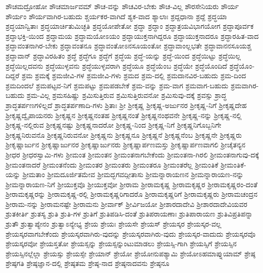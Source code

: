 {ಶೌಚಮದ್ರೋಹೋ
ಶೌಚಮಾರ್ಜವಮ್
ಶೌಚ-ವನ್ನು
ಶೌಚವಿರ-ಬೇಕು
ಶೌಚ-ವಿಲ್ಲ
ಶೌರಸೇನಿಯರು
ಶೌರ್ಯ
ಶೌರ್ಯಂ
ಶೌರ್ಯವಾಗಿರ-ಬಹುದು
ಶ್ಚರ್ಯಕರ-ವಾಗಿದೆ
ಶ್ಯಕ-ವಾದ
ಶ್ಯಾಲಾಃ
ಶ್ರದ್ದಧಾನಾ
ಶ್ರದ್ದೆ
ಶ್ರದ್ಧಯಾ
ಶ್ರದ್ಧಯಾನ್ವಿತಾಃ
ಶ್ರದ್ಧಯಾರ್ಚಿತುಮಿಚ್ಛತಿ
ಶ್ರದ್ಧಯೋಪೇತೋ
ಶ್ರದ್ಧಾ
ಶ್ರದ್ಧಾಂ
ಶ್ರದ್ಧಾತ್ರಯವಿಭಾಗಯೋಗ
ಶ್ರದ್ಧಾಪೂರ್ವಕ
ಶ್ರದ್ಧಾಭಕ್ತಿ-ಯಿಂದ
ಶ್ರದ್ಧಾಮಯ
ಶ್ರದ್ಧಾಮಯೋಽಯಂ
ಶ್ರದ್ಧಾಯುಕ್ತನಾಗಿದ್ದರೂ
ಶ್ರದ್ಧಾಯುಕ್ತನಾದರೂ
ಶ್ರದ್ಧಾರಹಿತ-ವಾದ
ಶ್ರದ್ಧಾವಂತನಾಗಿರ-ಬೇಕು
ಶ್ರದ್ಧಾವಂತನೂ
ಶ್ರದ್ಧಾವಂತೋಽನಸೂಯಂತೋ
ಶ್ರದ್ಧಾವಾಂಲ್ಲಭತೇ
ಶ್ರದ್ಧಾವಾನನಸೂಯಶ್ಚ
ಶ್ರದ್ಧಾವಾನ್
ಶ್ರದ್ಧಾವಿರಹಿತಂ
ಶ್ರದ್ಧೆ
ಶ್ರದ್ಧೆಗೂ
ಶ್ರದ್ಧೆಗೆ
ಶ್ರದ್ಧೆಯ
ಶ್ರದ್ಧೆ-ಯನ್ನು
ಶ್ರದ್ಧೆ-ಯಿಂದ
ಶ್ರದ್ಧೆಯಿಟ್ಟು
ಶ್ರದ್ಧೆಯಿಲ್ಲ
ಶ್ರದ್ಧೆಯಿಲ್ಲದವನು
ಶ್ರದ್ಧೆಯುಳ್ಳವನು
ಶ್ರದ್ಧೆಯುಳ್ಳವರಾಗಿ
ಶ್ರದ್ಧೆಯೂ
ಶ್ರದ್ಧೆಯೆಂಬ
ಶ್ರದ್ಧೆಯೇ
ಶ್ರದ್ಧೆಯೊಂದಿದೆ
ಶ್ರದ್ಧೆಯೊಂ-ದಿದ್ದರೆ
ಶ್ರಮ
ಶ್ರಮಕ್ಕೆ
ಶ್ರಮಜೀವಿ-ಗಳ
ಶ್ರಮಜೀವಿ-ಗಳು
ಶ್ರಮದ
ಶ್ರಮ-ದಲ್ಲಿ
ಶ್ರಮದಾನವಿರ-ಬಹುದು
ಶ್ರಮ-ದಿಂದ
ಶ್ರಮದಿಂದಲೆ
ಶ್ರಮಪಟ್ಟವ-ನಿಗೆ
ಶ್ರಮಪಟ್ಟು
ಶ್ರಮಪಡಬೇಕೆ
ಶ್ರಮ-ವನ್ನು
ಶ್ರಮ-ವಾಗ
ಶ್ರಮವಾಗ-ಬಹುದು
ಶ್ರಮವಾಗಿರ-ಬಹುದು
ಶ್ರಮ-ವಿಲ್ಲ
ಶ್ರಮಸಹಿಷ್ಣು
ಶ್ರಮಿಸುತ್ತಿರುವ
ಶ್ರಮಿಸುತ್ತಿರುವನೋ
ಶ್ರಮಿಸುವು-ದಕ್ಕೆ
ಶ್ರವಸ್ಸು
ಶ್ರಾದ್ಧ
ಶ್ರಾದ್ಧತರ್ಪಣಗಳಿಲ್ಲದೆ
ಶ್ರಾದ್ಧತರ್ಪಣಾದಿ-ಗಳು
ಶ್ರಿತಾಃ
ಶ್ರೀ
ಶ್ರೀಕೃಷ್ಣ
ಶ್ರೀಕೃಷ್ಣ-ಅರ್ಜುನರ
ಶ್ರೀಕೃಷ್ಣ-ನಿಗೆ
ಶ್ರೀಕೃಷ್ಣದೇಹ
ಶ್ರೀಕೃಷ್ಣದ್ವೈಪಾಯನರು
ಶ್ರೀಕೃಷ್ಣನ
ಶ್ರೀಕೃಷ್ಣನಂತಹ
ಶ್ರೀಕೃಷ್ಣನಂತೆ
ಶ್ರೀಕೃಷ್ಣನಂಥವನೇ
ಶ್ರೀಕೃಷ್ಣ-ನನ್ನು
ಶ್ರೀಕೃಷ್ಣ-ನಲ್ಲಿ
ಶ್ರೀಕೃಷ್ಣ-ನಲ್ಲಿರುವ
ಶ್ರೀಕೃಷ್ಣನಷ್ಟು
ಶ್ರೀಕೃಷ್ಣನಾದರೋ
ಶ್ರೀಕೃಷ್ಣ-ನಿಂದ
ಶ್ರೀಕೃಷ್ಣ-ನಿಗೆ
ಶ್ರೀಕೃಷ್ಣನಿಗೊಬ್ಬನಿಗೇ
ಶ್ರೀಕೃಷ್ಣನಿರುವನೊ
ಶ್ರೀಕೃಷ್ಣನಿರುವನೋ
ಶ್ರೀಕೃಷ್ಣನು
ಶ್ರೀಕೃಷ್ಣನೂ
ಶ್ರೀಕೃಷ್ಣನೆ
ಶ್ರೀಕೃಷ್ಣನೆಂಬ
ಶ್ರೀಕೃಷ್ಣನೇ
ಶ್ರೀಕೃಷ್ಣರು
ಶ್ರೀಕೃಷ್ಣಾರ್ಜುನ
ಶ್ರೀಕೃಷ್ಣಾರ್ಜುನರ
ಶ್ರೀಕೃಷ್ಣಾರ್ಜುನರು
ಶ್ರೀಕೃಷ್ಣಾರ್ಪಣಮಸ್ತು
ಶ್ರೀಕೃಷ್ಣಾರ್ಪಣವಾಗಲಿ
ಶ್ರೀಚೈತನ್ಯನ
ಶ್ರೀಧರ
ಶ್ರೀಧರಸ್ವಾಮಿ-ಗಳು
ಶ್ರೀಮಂತ
ಶ್ರೀಮಂತನ
ಶ್ರೀಮಂತನಾಗಬೇಕೆಂದು
ಶ್ರೀಮಂತನಾ-ಗಿರಲಿ
ಶ್ರೀಮಂತನಾಗುವು-ದಕ್ಕೆ
ಶ್ರೀಮಂತನಾದರೆ
ಶ್ರೀಮಂತನೆಂದು
ಶ್ರೀಮಂತರ
ಶ್ರೀಮಂತರು
ಶ್ರೀಮಂತರೂ
ಶ್ರೀಮಂತರೆಲ್ಲ
ಶ್ರೀಮಂತಿಕೆ
ಶ್ರೀಮಂತಿಕೆ-ಯನ್ನು
ಶ್ರೀಮತಾಂ
ಶ್ರೀಮದೂರ್ಜಿತಮೇವ
ಶ್ರೀಮದ್ಭಗವದ್ಗೀತಾಸು
ಶ್ರೀಮನ್ನಾರಾಯಣನ
ಶ್ರೀಮನ್ನಾರಾಯಣ-ನನ್ನು
ಶ್ರೀಮನ್ನಾರಾಯಣ-ನಿಗೆ
ಶ್ರೀಯುಕ್ತವೊ
ಶ್ರೀಯುಕ್ತವೋ
ಶ್ರೀರಾಮ
ಶ್ರೀರಾಮಕೃಷ್ಣ
ಶ್ರೀರಾಮಕೃಷ್ಣರ
ಶ್ರೀರಾಮಕೃಷ್ಣರಂ-ದಂತೆ
ಶ್ರೀರಾಮಕೃಷ್ಣರನ್ನು
ಶ್ರೀರಾಮಕೃಷ್ಣ-ರಲ್ಲಿ
ಶ್ರೀರಾಮಕೃಷ್ಣರಿಗಾದರೊ
ಶ್ರೀರಾಮಕೃಷ್ಣರಿಗೆ
ಶ್ರೀರಾಮಕೃಷ್ಣರು
ಶ್ರೀರಾಮಚಂದ್ರನ
ಶ್ರೀರಾಮ-ನನ್ನು
ಶ್ರೀರಾಮನಷ್ಟೇ
ಶ್ರೀರಾಮನು
ಶ್ರೀರ್ವಾಕ್
ಶ್ರೀರ್ವಿಜಯೋ
ಶ್ರೀಶಾರದಾದೇವಿ
ಶ್ರೀಶಾರದಾದೇವಿಯವರ
ಶ್ರುತಕೀರ್ತಿ
ಶ್ರುತಸ್ಯ
ಶ್ರುತಿ
ಶ್ರುತಿ-ಗಳ
ಶ್ರುತಿಗೆ
ಶ್ರುತಿಪಡಿಸಿ-ದಂತೆ
ಶ್ರುತಿಪರಾಯಣಾಃ
ಶ್ರುತಿಪಾರಾಯಣ
ಶ್ರುತಿವಿಪ್ರತಿಪನ್ನಾ
ಶ್ರುತೌ
ಶ್ರುತ್ವಾಪ್ಯೇನಂ
ಶ್ರುತ್ವಾಽನ್ಯೇಭ್ಯ
ಶ್ರೇಯ
ಶ್ರೇಯಃ
ಶ್ರೇಯಸೇ
ಶ್ರೇಯಸ್
ಶ್ರೇಯಸ್ಕರ
ಶ್ರೇಯಸ್ಕರ-ವಲ್ಲ
ಶ್ರೇಯಸ್ಕರವಾಗಬೇಕೆಂದು
ಶ್ರೇಯಸ್ಕರವಾಗಿರು-ವುದನ್ನು
ಶ್ರೇಯಸ್ಕರವಾಗಿರು-ವುದು
ಶ್ರೇಯಸ್ಕರ-ವಾದುದು
ಶ್ರೇಯಸ್ಕರವೊ
ಶ್ರೇಯಸ್ಕರವೋ
ಶ್ರೇಯಸ್ತತೋ
ಶ್ರೇಯಸ್ಸನ್ನು
ಶ್ರೇಯಸ್ಸನ್ನುಂಟುಮಾಡಲು
ಶ್ರೇಯಸ್ಸಿ-ಗಾಗಿ
ಶ್ರೇಯಸ್ಸಿಗೆ
ಶ್ರೇಯಸ್ಸಿನ
ಶ್ರೇಯಸ್ಸಿನಲ್ಲೆಲ್ಲಾ
ಶ್ರೇಯಸ್ಸು
ಶ್ರೇಯಸ್ಸೇ
ಶ್ರೇಯಾನ್
ಶ್ರೇಯೋ
ಶ್ರೇಯೋನುಪಶ್ಯಾಮಿ
ಶ್ರೇಯೋಽಹಮಾಪ್ನುಯಾಮ್
ಶ್ರೇಷ್ಠ
ಶ್ರೇಷ್ಠಗತಿ
ಶ್ರೇಷ್ಠಜ್ಞಾನ-ದಲ್ಲಿ
ಶ್ರೇಷ್ಠತಮ
ಶ್ರೇಷ್ಠ-ನಾದ
ಶ್ರೇಷ್ಠನಾದವನು
ಶ್ರೇಷ್ಠನೂ
}

